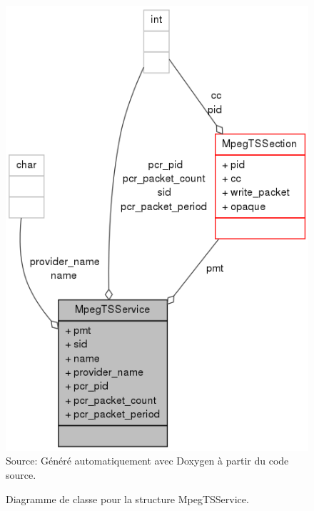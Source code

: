 \documentclass[12pt,a4paper]{article}
\begin{document}
\begin{figure}[!b]
\centering
\caption{Diagramme de classe pour la structure MpegTSService.}
\includegraphics[width=0.8\linewidth]{pictures/structMpegTSService__coll__graph.png}
\\Source: Généré automatiquement avec Doxygen à partir du code source.
\label{fig:structMpegTSService__coll__graph}
\end{figure}
\end{document}
